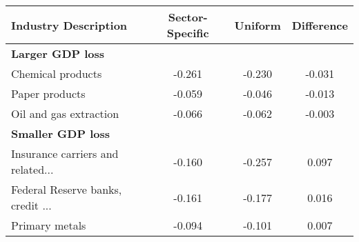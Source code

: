 \begin{tabular}{lccc}
\toprule
Industry Description & Sector-Specific & Uniform & Difference \\
\midrule
\midrule
\multicolumn{2}{l}{\textbf{Larger GDP loss}} \\
\midrule
Chemical products & -0.261 & -0.230 & -0.031 \\
Paper products & -0.059 & -0.046 & -0.013 \\
Oil and gas extraction & -0.066 & -0.062 & -0.003 \\
\midrule
\multicolumn{2}{l}{\textbf{Smaller GDP loss}} \\
\midrule
Insurance carriers and related... & -0.160 & -0.257 & 0.097 \\
Federal Reserve banks, credit ... & -0.161 & -0.177 & 0.016 \\
Primary metals & -0.094 & -0.101 & 0.007 \\
\bottomrule
\end{tabular}